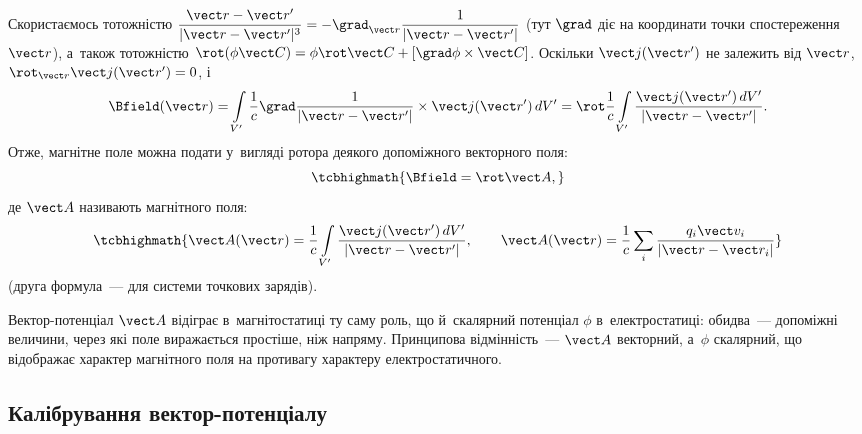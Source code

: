 Скористаємось тотожністю $\dfrac{\vect r - \vect r'}{|\vect r-\vect r'|^3} = -\grad_{\vect
		r} \dfrac1{|\vect r - \vect r'|}$ (тут $\grad$ діє на координати точки спостереження
$\vect r$), а~також тотожністю $\rot(\phi\vect C) = \phi\rot\vect C +
	\left[\grad\phi\times\vect C\right]$. Оскільки $\vect j(\vect r')$ не залежить від $\vect
	r$, $\rot_{\vect r}\vect j(\vect r') = 0$, і
\begin{equation*}
	\Bfield(\vect r) = \int\limits_{V'} \frac1c \grad\frac1{|\vect r-\vect r'|}\times\vect j(\vect r')\, dV' = \rot\frac1c\int\limits_{V'}
	\frac{\vect j(\vect r')\, dV'}{|\vect r-\vect r'|}.
\end{equation*}
Отже, магнітне поле можна подати у~вигляді ротора деякого допоміжного векторного поля:
\begin{equation}\label{eq:BrotA}
	\tcbhighmath{
		\Bfield = \rot\vect A,
	}
\end{equation}
де $\vect A$ називають  магнітного поля:
\begin{equation}\label{eq:VectorPotentialDef}
	\tcbhighmath{
		\vect A(\vect r) = \frac1c\int\limits_{V'} \frac{\vect j(\vect r')\, dV'}{|\vect r-\vect r'|}, \qquad \vect A(\vect r) = \frac1c
		\sum\limits_i \frac{q_i\vect v_i}{|\vect r - \vect r_i|}
	}
\end{equation}
(друга формула~--- для системи точкових зарядів).

\begin{Attention}
	Вектор-потенціал $\vect A$ відіграє в~магнітостатиці ту саму роль, що й~скалярний
	потенціал $\phi$ в~електростатиці: обидва~--- допоміжні величини, через які поле
	виражається простіше, ніж напряму. Принципова відмінність~--- $\vect A$ векторний,
	а~$\phi$ скалярний, що відображає  характер магнітного поля на
	противагу  характеру електростатичного.
\end{Attention}


\subsection*{Калібрування вектор-потенціалу}


